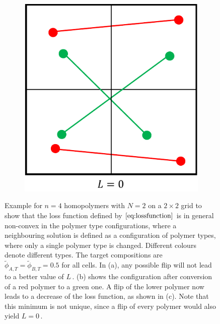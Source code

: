 \documentclass[bachelor,       %
               twoside,        %
               BCOR10mm,       %
               ngerman, english %
               ]{GAUBM}
\begin{document}
\begin{figure}[h]
\begin{subfigure}[b]{0.3\textwidth}
      \caption{}
      \label{fig:loss-2}
  \end{subfigure}
      \hfill
  \begin{subfigure}[b]{0.3\textwidth}
      \centering
      \includegraphics[width=\textwidth]{figures/loss-3.pdf}
      \caption{}
      \label{fig:loss-3}
  \end{subfigure}
     \caption{Example for $n=4$ homopolymers with $N=2$ on a $2\times 2$ grid to show that the loss function defined by $\eqref{eq:lossfunction}$ is in general non-convex in the polymer type configurations, where a neighbouring solution is defined as a configuration of polymer types, where only a single polymer type is changed. Different colours denote different types. The target compositions are $\tilde\phi_{A,T}=\tilde\phi_{B,T}=0.5$ for all cells. In (a), any possible flip will not lead to a better value of $L\,.$ (b) shows the configuration after conversion of a red polymer to a green one. A flip of the lower polymer now leads to a decrease of the loss function, as shown in (c). Note that this minimum is not unique, since a flip of every polymer would also yield $L=0\,.$}
     \label{fig:loss}
\end{figure}





 


\end{document}
